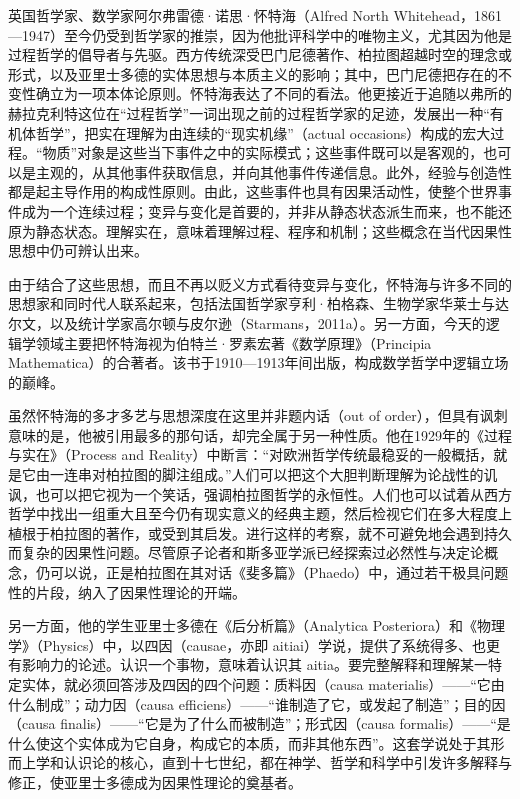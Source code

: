 英国哲学家、数学家阿尔弗雷德·诺思·怀特海（Alfred North Whitehead，1861—1947）至今仍受到哲学家的推崇，因为他批评科学中的唯物主义，尤其因为他是过程哲学的倡导者与先驱。西方传统深受巴门尼德著作、柏拉图超越时空的理念或形式，以及亚里士多德的实体思想与本质主义的影响；其中，巴门尼德把存在的不变性确立为一项本体论原则。怀特海表达了不同的看法。他更接近于追随以弗所的赫拉克利特这位在“过程哲学”一词出现之前的过程哲学家的足迹，发展出一种“有机体哲学”，把实在理解为由连续的“现实机缘”（actual occasions）构成的宏大过程。“物质”对象是这些当下事件之中的实际模式；这些事件既可以是客观的，也可以是主观的，从其他事件获取信息，并向其他事件传递信息。此外，经验与创造性都是起主导作用的构成性原则。由此，这些事件也具有因果活动性，使整个世界事件成为一个连续过程；变异与变化是首要的，并非从静态状态派生而来，也不能还原为静态状态。理解实在，意味着理解过程、程序和机制；这些概念在当代因果性思想中仍可辨认出来。

由于结合了这些思想，而且不再以贬义方式看待变异与变化，怀特海与许多不同的思想家和同时代人联系起来，包括法国哲学家亨利·柏格森、生物学家华莱士与达尔文，以及统计学家高尔顿与皮尔逊（Starmans，2011a）。另一方面，今天的逻辑学领域主要把怀特海视为伯特兰·罗素宏著《数学原理》（Principia Mathematica）的合著者。该书于1910—1913年间出版，构成数学哲学中逻辑立场的巅峰。

虽然怀特海的多才多艺与思想深度在这里并非题内话（out of order），但具有讽刺意味的是，他被引用最多的那句话，却完全属于另一种性质。他在1929年的《过程与实在》（Process and Reality）中断言：“对欧洲哲学传统最稳妥的一般概括，就是它由一连串对柏拉图的脚注组成。”人们可以把这个大胆判断理解为论战性的讥讽，也可以把它视为一个笑话，强调柏拉图哲学的永恒性。人们也可以试着从西方哲学中找出一组重大且至今仍有现实意义的经典主题，然后检视它们在多大程度上植根于柏拉图的著作，或受到其启发。进行这样的考察，就不可避免地会遇到持久而复杂的因果性问题。尽管原子论者和斯多亚学派已经探索过必然性与决定论概念，仍可以说，正是柏拉图在其对话《斐多篇》（Phaedo）中，通过若干极具问题性的片段，纳入了因果性理论的开端。

另一方面，他的学生亚里士多德在《后分析篇》（Analytica Posteriora）和《物理学》（Physics）中，以四因（causae，亦即 aitiai）学说，提供了系统得多、也更有影响力的论述。认识一个事物，意味着认识其 aitia。要完整解释和理解某一特定实体，就必须回答涉及四因的四个问题：质料因（causa materialis）——“它由什么制成”；动力因（causa efficiens）——“谁制造了它，或发起了制造”；目的因（causa finalis）——“它是为了什么而被制造”；形式因（causa formalis）——“是什么使这个实体成为它自身，构成它的本质，而非其他东西”。这套学说处于其形而上学和认识论的核心，直到十七世纪，都在神学、哲学和科学中引发许多解释与修正，使亚里士多德成为因果性理论的奠基者。

